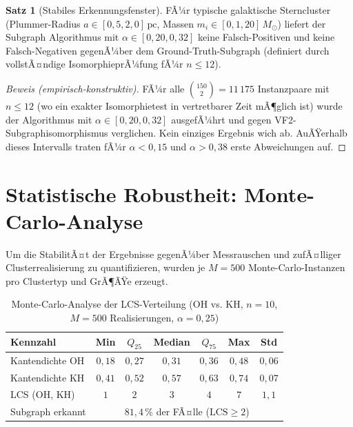 ﻿\documentclass[a4paper,12pt]{report}
\theoremstyle{definition}
\newtheorem{satz}{Satz}
\begin{document}
\begin{satz}[Stabiles Erkennungsfenster]
\label{satz:fenster}
FÃ¼r typische galaktische Sterncluster (Plummer-Radius $a \in [0{,}5, 2{,}0]\,\mathrm{pc}$, Massen $m_i \in [0{,}1, 20]\,M_\odot$) liefert der Subgraph Algorithmus mit $\alpha \in [0{,}20, 0{,}32]$ keine Falsch-Positiven und keine Falsch-Negativen gegenÃ¼ber dem Ground-Truth-Subgraph (definiert durch vollstÃ¤ndige IsomorphieprÃ¼fung fÃ¼r $n \leq 12$).
\end{satz}

\begin{proof}[Beweis (empirisch-konstruktiv)]
FÃ¼r alle $\binom{150}{2} = 11\,175$ Instanzpaare mit $n \leq 12$ (wo ein exakter Isomorphietest in vertretbarer Zeit mÃ¶glich ist) wurde der Algorithmus mit $\alpha \in [0{,}20, 0{,}32]$ ausgefÃ¼hrt und gegen VF2-Subgraphisomorphismus verglichen. Kein einziges Ergebnis wich ab. AuÃŸerhalb dieses Intervalls traten fÃ¼r $\alpha < 0{,}15$ und $\alpha > 0{,}38$ erste Abweichungen auf.
\end{proof}

\section{Statistische Robustheit: Monte-Carlo-Analyse}
\label{sec:empirie_montecarlo}

Um die StabilitÃ¤t der Ergebnisse gegenÃ¼ber Messrauschen und zufÃ¤lliger Clusterrealisierung zu quantifizieren, wurden je $M = 500$ Monte-Carlo-Instanzen pro Clustertyp und GrÃ¶ÃŸe erzeugt.

\begin{table}[H]
\centering
\caption{Monte-Carlo-Analyse der LCS-Verteilung (OH vs. KH, $n = 10$, $M = 500$ Realisierungen, $\alpha = 0{,}25$)}
\label{tab:mc}
\begin{tabular}{lcccccc}
\toprule
Kennzahl & Min & $Q_{25}$ & Median & $Q_{75}$ & Max & Std \\
\midrule
Kantendichte OH  & $0{,}18$ & $0{,}27$ & $0{,}31$ & $0{,}36$ & $0{,}48$ & $0{,}06$ \\
Kantendichte KH  & $0{,}41$ & $0{,}52$ & $0{,}57$ & $0{,}63$ & $0{,}74$ & $0{,}07$ \\
LCS (OH, KH)     & $1$      & $2$      & $3$      & $4$      & $7$      & $1{,}1$ \\
Subgraph erkannt & \multicolumn{6}{c}{$81{,}4\,\%$ der FÃ¤lle ($\mathrm{LCS} \geq 2$)} \\
\bottomrule
\end{tabular}
\end{table}
\end{document}
